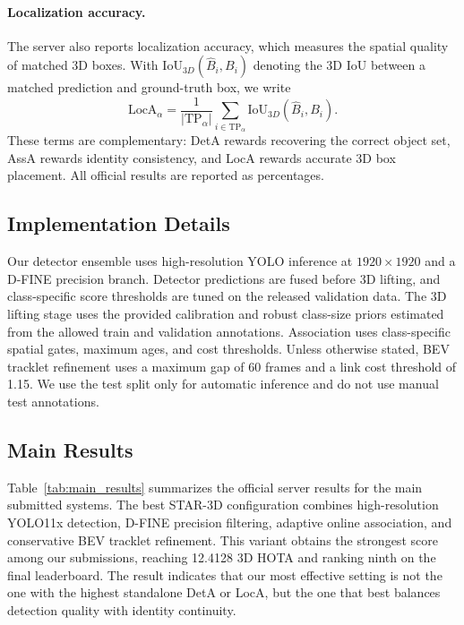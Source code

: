 \documentclass[runningheads]{llncs}
\begin{document}
\paragraph{Localization accuracy.}
The server also reports localization accuracy, which measures the spatial quality
of matched 3D boxes. With $\mathrm{IoU}_{3D}(\hat{B}_i,B_i)$ denoting the 3D IoU
between a matched prediction and ground-truth box, we write
\begin{equation}
    \mathrm{LocA}_{\alpha}
    =
    \frac{1}{|\mathrm{TP}_{\alpha}|}
    \sum_{i\in\mathrm{TP}_{\alpha}}
    \mathrm{IoU}_{3D}(\hat{B}_i,B_i).
    \label{eq:loca}
\end{equation}
These terms are complementary: DetA rewards recovering the correct object set,
AssA rewards identity consistency, and LocA rewards accurate 3D box placement.
All official results are reported as percentages.

\subsection{Implementation Details}
\label{sec:exp_implementation}

Our detector ensemble uses high-resolution YOLO inference at $1920\times1920$ and
a D-FINE precision branch. Detector predictions are fused before 3D lifting, and
class-specific score thresholds are tuned on the released validation data. The 3D
lifting stage uses the provided calibration and robust class-size priors estimated
from the allowed train and validation annotations. Association uses class-specific
spatial gates, maximum ages, and cost thresholds. Unless otherwise stated, BEV
tracklet refinement uses a maximum gap of 60 frames and a link cost threshold of
1.15. We use the test split only for automatic inference and do not use manual
test annotations.

\subsection{Main Results}
\label{sec:exp_main}

Table~\ref{tab:main_results} summarizes the official server results for the main
submitted systems. The best STAR-3D configuration combines high-resolution YOLO11x
detection, D-FINE precision filtering, adaptive online association, and conservative
BEV tracklet refinement. This variant obtains the strongest score among our
submissions, reaching 12.4128 3D HOTA and ranking ninth on the final leaderboard.
The result indicates that our most effective setting is not the one with the
highest standalone DetA or LocA, but the one that best balances detection quality
with identity continuity.
\end{document}
